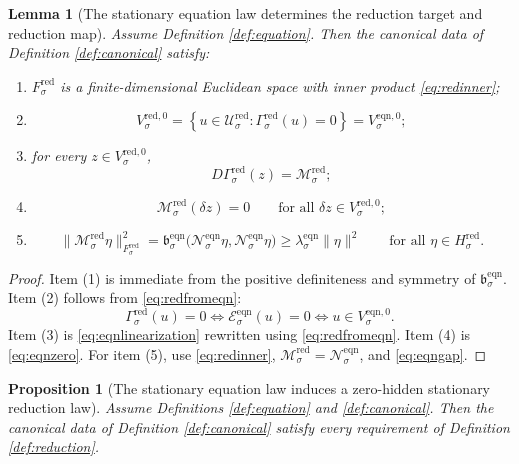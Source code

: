 \documentclass[11pt]{article}
\newcommand{\RedSpace}[1]{\mathcal U_{#1}^{\mathrm{red}}}
\newcommand{\RedTarget}[1]{F_{#1}^{\mathrm{red}}}
\newcommand{\RedMap}[1]{\Gamma_{#1}^{\mathrm{red}}}
\newcommand{\RedZero}[1]{V_{#1}^{\mathrm{red},0}}
\newcommand{\RedHidden}[1]{H_{#1}^{\mathrm{red}}}
\newcommand{\RedLin}[1]{\mathcal M_{#1}^{\mathrm{red}}}
\newcommand{\EqnPair}[1]{\mathfrak b_{#1}^{\mathrm{eqn}}}
\newcommand{\EqnResidual}[1]{\mathcal E_{#1}^{\mathrm{eqn}}}
\newcommand{\EqnZero}[1]{V_{#1}^{\mathrm{eqn},0}}
\newcommand{\EqnLin}[1]{\mathcal N_{#1}^{\mathrm{eqn}}}
\newtheorem{lemma}{Lemma}
\newtheorem{proposition}{Proposition}
\begin{document}
\begin{lemma}[The stationary equation law determines the reduction target and reduction map]
\label{lem:reduction}
Assume Definition \ref{def:equation}. Then the canonical data of Definition \ref{def:canonical} satisfy:
\begin{enumerate}
    \item \(\RedTarget{\sigma}\) is a finite-dimensional Euclidean space with inner product \eqref{eq:redinner};
    \item
    \[
    \RedZero{\sigma}
    =
    \left\{
    u\in\RedSpace{\sigma}:
    \RedMap{\sigma}(u)=0
    \right\}
    =
    \EqnZero{\sigma};
    \]
    \item for every \(z\in\RedZero{\sigma}\),
    \[
    D\RedMap{\sigma}(z)=\RedLin{\sigma};
    \]
    \item
    \[
    \RedLin{\sigma}(\delta z)=0
    \qquad
    \text{for all }\delta z\in\RedZero{\sigma};
    \]
    \item
    \[
    \|\RedLin{\sigma}\eta\|_{\RedTarget{\sigma}}^{2}
    =
    \EqnPair{\sigma}\bigl(\EqnLin{\sigma}\eta,\EqnLin{\sigma}\eta\bigr)
    \ge
    \lambda_{\sigma}^{\mathrm{eqn}}\|\eta\|^{2}
    \qquad
    \text{for all }\eta\in\RedHidden{\sigma}.
    \]
\end{enumerate}
\end{lemma}

\begin{proof}
Item (1) is immediate from the positive definiteness and symmetry of \(\EqnPair{\sigma}\). Item (2) follows from \eqref{eq:redfromeqn}:
\[
\RedMap{\sigma}(u)=0
\iff
\EqnResidual{\sigma}(u)=0
\iff
u\in\EqnZero{\sigma}.
\]
Item (3) is \eqref{eq:eqnlinearization} rewritten using \eqref{eq:redfromeqn}. Item (4) is \eqref{eq:eqnzero}. For item (5), use \eqref{eq:redinner}, \(\RedLin{\sigma}=\EqnLin{\sigma}\), and \eqref{eq:eqngap}.
\end{proof}

\begin{proposition}[The stationary equation law induces a zero-hidden stationary reduction law]
\label{prop:reduction}
Assume Definitions \ref{def:equation} and \ref{def:canonical}. Then the canonical data of Definition \ref{def:canonical} satisfy every requirement of Definition \ref{def:reduction}.
\end{proposition}
\end{document}
